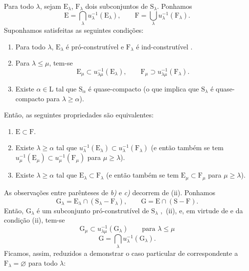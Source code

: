 \begin{theorem}[8.3.2]
\label{IV.8.3.2}
Para todo $\lambda$, sejam $\mathrm{E}_\lambda$, $\mathrm{F}_\lambda$ dois subconjuntos de $\mathrm{S}_\lambda$.
Ponhamos
\begin{equation}
  \mathrm{E}=\bigcap_\lambda u_\lambda^{-1}(\mathrm{E}_\lambda),\qquad \mathrm{F}=\bigcup_\lambda u_\lambda^{-1}(\mathrm{F}_\lambda).
  \tag{8.3.2.1}
\label{IV.8.3.2.1}
\end{equation}
Suponhamos satisfeitas as seguintes condições:
\begin{enumerate}[label=(\roman*)]
  \item Para todo $\lambda$, $\mathrm{E}_\lambda$ é pró-construtível e $\mathrm{F}_\lambda$ é ind-construtível .
  \item Para $\lambda\leqslant\mu$, tem-se
  \[
    \mathrm{E}_\mu\subset u_{\lambda\mu}^{-1}(\mathrm{E}_\lambda),\qquad \mathrm{F}_\mu\supset u_{\lambda\mu}^{-1}(\mathrm{F}_\lambda).
  \]
  \item Existe $\alpha\in\mathrm{L}$ tal que $\mathrm{S}_\alpha$ é quase-compacto (o que implica que $\mathrm{S}_\lambda$ é quase-compacto para $\lambda\geqslant\alpha$).
\end{enumerate}
Então, as seguintes propriedades são equivalentes:
\begin{enumerate}[label=\emph{\alph*)}]
  \item $\mathrm{E}\subset\mathrm{F}$.
  \item Existe $\lambda\geqslant\alpha$ tal que $u_\lambda^{-1}(\mathrm{E}_\lambda)\subset u_\lambda^{-1}(\mathrm{F}_\lambda)$ (e então também se tem $u_\mu^{-1}(\mathrm{E}_\mu)\subset u_\mu^{-1}(\mathrm{F}_\mu)$ para
$\mu\geqslant\lambda$).
  \item Existe $\lambda\geqslant\alpha$ tal que $\mathrm{E}_\lambda\subset\mathrm{F}_\lambda$ (e então também se tem $\mathrm{E}_\mu\subset\mathrm{F}_\mu$ para $\mu\geqslant\lambda$).
\end{enumerate}
As observações entre parênteses de \emph{b)} e \emph{c)} decorrem de (ii).
Ponhamos
\[
  \mathrm{G}_\lambda=\mathrm{E}_\lambda\cap(\mathrm{S}_\lambda-\mathrm{F}_\lambda),\qquad \mathrm{G}=\mathrm{E}\cap(\mathrm{S}-\mathrm{F}).
\]
Então, $\mathrm{G}_\lambda$ é um subconjunto pró-construtível de $\mathrm{S}_\lambda$ ,~(ii), e, em virtude de  e da condição (ii), tem-se
\[
  \mathrm{G}_\mu\subset u_{\lambda\mu}^{-1}(\mathrm{G}_\lambda)\qquad\text{para }\lambda\leqslant\mu
\]
\[
  \mathrm{G}=\bigcap_\lambda u_\lambda^{-1}(\mathrm{G}_\lambda).
\]
Ficamos, assim, reduzidos a demonstrar o caso particular de  correspondente a $\mathrm{F}_\lambda=\varnothing$ para todo $\lambda$:
\end{theorem}

